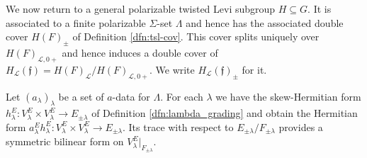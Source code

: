 \documentclass{article}
\def\mc#1{\mathcal{#1}}
\theoremstyle{definition}
\numberwithin{equation}{subsection}
\renewcommand{\-}{\hyp{}}
\newcommand{\rf}{\mathfrak{f}}
\begin{document}
We now return to a general polarizable twisted Levi subgroup $H \subseteq G$. It is associated to a finite polarizable $\Sigma$-set $\Lambda$ and hence has the associated double cover $H(F)_\pm$ of Definition \ref{dfn:tsl-cov}. This cover splits uniquely over $H(F)_{\mc{L},0+}$ and hence induces a double cover of $H_\mc{L}(\rf)=H(F)_\mc{L}/H(F)_{\mc{L},0+}$. We write $H_\mc{L}(\rf)_\pm$ for it. 

Let $(a_\lambda)_\lambda$ be a set of $a$-data for $\Lambda$. For each $\lambda$ we have the skew-Hermitian form $h_\lambda^E : V_\lambda^E \times V_\lambda^E \to E_{\pm\lambda}$ of Definition \ref{dfn:lambda_grading} and obtain the Hermitian form $a_\lambda^E h_\lambda^E : V_\lambda^E \times V_\lambda^E \to E_{\pm\lambda}$. Its trace with respect to $E_{\pm\lambda}/F_{\pm\lambda}$ provides a symmetric bilinear form on $V_\lambda^E|_{F_{\pm\lambda}}$.
\end{document}
